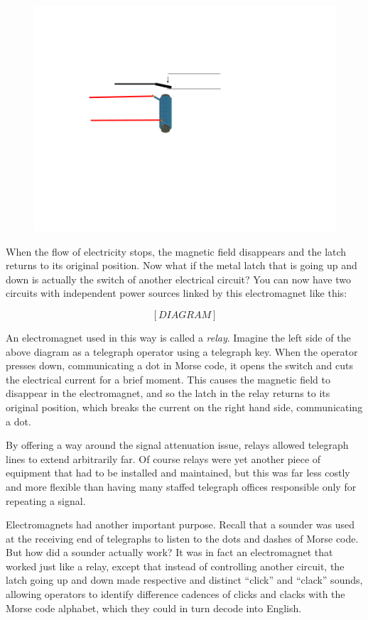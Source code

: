 \documentclass[UTF8]{book}
\begin{document}
\begin{CJK}{UTF8}{gbsn}
\begin{figure}[H]
\centering
\includegraphics[width=0.8\linewidth]{electromagnet_with_latch_2}
\end{figure}

When the flow of electricity stops, the magnetic field disappears and the latch returns to its original position. Now what if the metal latch that is going up and down is actually the switch of another electrical circuit? You can now have two circuits with independent power sources linked by this electromagnet like this:

\[ [DIAGRAM] \]

An electromagnet used in this way is called a \emph{relay}. Imagine the left side of the above diagram as a telegraph operator using a telegraph key. When the operator presses down, communicating a dot in Morse code, it opens the switch and cuts the electrical current for a brief moment. This causes the magnetic field to disappear in the electromagnet, and so the latch in the relay returns to its original position, which breaks the current on the right hand side, communicating a dot.

By offering a way around the signal attenuation issue, relays allowed telegraph lines to extend arbitrarily far. Of course relays were yet another piece of equipment that had to be installed and maintained, but this was far less costly and more flexible than having many staffed telegraph offices responsible only for repeating a signal.

Electromagnets had another important purpose. Recall that a sounder was used at the receiving end of telegraphs to listen to the dots and dashes of Morse code. But how did a sounder actually work? It was in fact an electromagnet that worked just like a relay, except that instead of controlling another circuit, the latch going up and down made respective and distinct ``click'' and ``clack'' sounds, allowing operators to identify difference cadences of clicks and clacks with the Morse code alphabet, which they could in turn decode into English.


\end{CJK}
\end{document}
